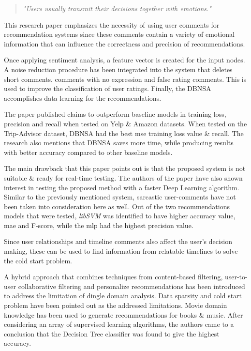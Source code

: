 \begin{quote} 
\centering 
\emph{"Users usually transmit their decisions together with emotions."} 
\\
\raggedleft
\autocite{chen_user_2019}
\end{quote}

This research paper emphasizes the necessity of using user comments for recommendation systems since these comments contain a variety of emotional information that can influence the correctness and precision of recommendations.

Once applying sentiment analysis, a feature vector is created for the input nodes. A noise reduction procedure has been integrated into the system that deletes short comments, comments with no expression and false rating comments. This is used to improve the classification of user ratings. Finally, the DBNSA accomplishes data learning for the recommendations.

The paper published claims to outperform baseline models in training loss, precision and recall when tested on Yelp \& Amazon datasets. When tested on the Trip-Advisor dataset, DBNSA had the best \gls{mse} training loss value \& recall. The research also mentions that DBNSA saves more time, while producing results with better accuracy compared to other baseline models.

The main drawback that this paper points out is that the proposed system is not suitable \& ready for real-time testing. The authors of the paper have also shown interest in testing the proposed method with a faster Deep Learning algorithm. Similar to the previously mentioned system, sarcastic user-comments have not been taken into consideration here as well.
Out of the two recommendations models that were tested, \emph{libSVM} was identified to have higher accuracy value, \gls{mae} and F-score, while the \gls{mlp} had the highest precision value.

Since user relationships and timeline comments also affect the user's decision making, these can be used to find information from relatable timelines to solve the cold start problem.

\bigbreak
A hybrid approach that combines techniques from content-based filtering, user-to-user collaborative filtering and personalize recommendations \autocite{ayushi_cross-domain_2018} has been introduced to address the limitation of dingle domain analysis. Data sparsity and cold start problem have been pointed out as the addressed limitations. Movie domain knowledge has been used to generate recommendations for books \& music. 
After considering an array of supervised learning algorithms, the authors came to a conclusion that the Decision Tree classifier was found to give the highest accuracy.

